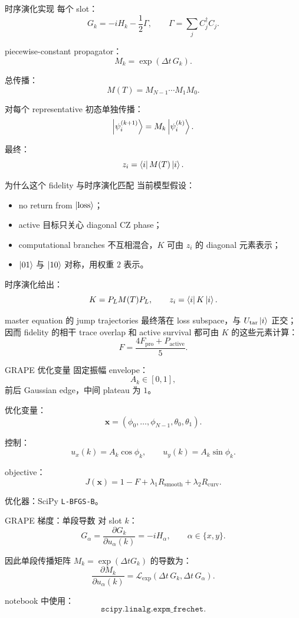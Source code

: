 \documentclass[aspectratio=169,11pt]{ctexbeamer}
\newcommand{\ketloss}{\ket{\mathrm{loss}}}
\newcommand{\Fpro}{F_{\mathrm{pro}}}
\newcommand{\Pact}{P_{\mathrm{active}}}
\newcommand{\Fgate}{F}
\begin{document}
\begin{frame}{时序演化实现}
  每个 slot：
  \[
  G_k=-iH_k-\frac12\Gamma,
  \qquad
  \Gamma=\sum_j C_j^\dagger C_j.
  \]

  piecewise-constant propagator：
  \[
  M_k=\exp(\Delta t\,G_k).
  \]

  总传播：
  \[
  M(T)=M_{N-1}\cdots M_1 M_0.
  \]

  对每个 representative 初态单独传播：
  \[
  \ket{\psi_i^{(k+1)}}=M_k\ket{\psi_i^{(k)}}.
  \]

  最终：
  \[
  z_i=\bra{i}M(T)\ket{i}.
  \]
\end{frame}

\begin{frame}{为什么这个 fidelity 与时序演化匹配}
  当前模型假设：
  \begin{itemize}
    \item no return from \(\ketloss\)；
    \item active 目标只关心 diagonal CZ phase；
    \item computational branches 不互相混合，\(K\) 可由 \(z_i\) 的 diagonal 元素表示；
    \item \(\ket{01}\) 与 \(\ket{10}\) 对称，用权重 \(2\) 表示。
  \end{itemize}

  时序演化给出：
  \[
  K=P_LM(T)P_L,\qquad z_i=\bra{i}K\ket{i}.
  \]

  master equation 的 jump trajectories 最终落在 loss subspace，与 \(U_{\mathrm{tar}}\ket{i}\) 正交；
  因而 fidelity 的相干 trace overlap 和 active survival 都可由 \(K\) 的这些元素计算：
  \[
  \Fgate=\frac{4\Fpro+\Pact}{5}.
  \]
\end{frame}

\begin{frame}{GRAPE 优化变量}
  固定振幅 envelope：
  \[
  A_k\in[0,1],
  \]
  前后 Gaussian edge，中间 plateau 为 \(1\)。

  优化变量：
  \[
  \bm{x}=(\phi_0,\ldots,\phi_{N-1},\theta_0,\theta_1).
  \]

  控制：
  \[
  u_x(k)=A_k\cos\phi_k,
  \qquad
  u_y(k)=A_k\sin\phi_k.
  \]

  objective：
  \[
  J(\bm{x})=1-\Fgate+\lambda_1 R_{\mathrm{smooth}}+\lambda_2 R_{\mathrm{curv}}.
  \]

  优化器：SciPy \texttt{L-BFGS-B}。
\end{frame}

\begin{frame}{GRAPE 梯度：单段导数}
  对 slot \(k\)：
  \[
  G_\alpha=\frac{\partial G_k}{\partial u_\alpha(k)}
  =
  -iH_\alpha,
  \qquad
  \alpha\in\{x,y\}.
  \]

  因此单段传播矩阵 \(M_k=\exp(\Delta tG_k)\) 的导数为：
  \[
  \frac{\partial M_k}{\partial u_\alpha(k)}
  =
  \mathcal{L}_{\exp}
  \left(\Delta t\,G_k,\Delta t\,G_\alpha\right).
  \]

  notebook 中使用：
  \[
  \texttt{scipy.linalg.expm\_frechet}.
  \]
\end{frame}
\end{document}
